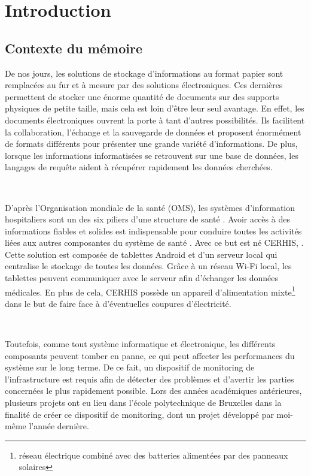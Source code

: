 \chapter{Introduction}
\section{Contexte du mémoire}

\noindent
De nos jours, les solutions de stockage d'informations au format papier sont remplacées au fur et à mesure par des solutions électroniques. Ces dernières permettent de stocker une énorme quantité de documents sur des supports physiques de petite taille, mais cela est loin d'être leur seul avantage. En effet, les documents électroniques ouvrent la porte à tant d'autres possibilités. Ils facilitent la collaboration, l'échange et la sauvegarde de données et proposent énormément de formats différents pour présenter une grande variété d'informations. De plus, lorsque les informations informatisées se retrouvent sur une base de données, les langages de requête aident à récupérer rapidement les données cherchées.

~

\noindent
D'après l'Organisation mondiale de la santé (OMS), les systèmes d'information hospitaliers sont un des six piliers d'une structure de santé \cite{world2010monitoring}. Avoir accès à des informations fiables et solides est indispensable pour conduire toutes les activités liées aux autres composantes du système de santé \cite{Mutale2013}. Avec ce but est né CERHIS, . Cette solution est composée de tablettes Android et d'un serveur local qui centralise le stockage de toutes les données. Grâce à un réseau Wi-Fi local, les tablettes peuvent communiquer avec le serveur afin d'échanger les données médicales. En plus de cela, CERHIS possède un appareil d'alimentation mixte\footnote{réseau électrique combiné avec des batteries alimentées par des panneaux solaires} dans le but de faire face à d'éventuelles coupures d'électricité.


~


\noindent
Toutefois, comme tout système informatique et électronique, les différents composants peuvent tomber en panne, ce qui peut affecter les performances du système sur le long terme. De ce fait, un dispositif de monitoring de l'infrastructure est requis afin de détecter des problèmes et d'avertir les parties concernées le plus rapidement possible. Lors des années académiques antérieures, plusieurs projets ont eu lieu dans l'école polytechnique de Bruxelles dans la finalité de créer ce dispositif de monitoring, dont un projet développé par moi-même l'année dernière.

